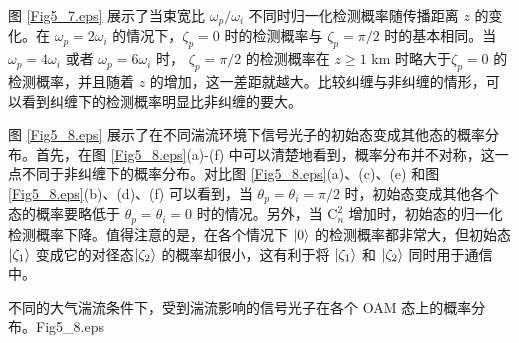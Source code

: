 \documentclass[master]{thesis-uestc}
\begin{document}

图 \ref{Fig5_7.eps} 展示了当束宽比 $\omega_p/\omega_i$ 不同时归一化检测概率随传播距离 $z$ 的变化。在 $\omega_p=2\omega_i$ 的情况下，$\zeta_p=0$ 时的检测概率与 $\zeta_p=\pi/2$ 时的基本相同。当 $\omega_p=4\omega_i$ 或者 $\omega_p=6\omega_i$ 时， $\zeta_p=\pi/2$ 的检测概率在 $z\geq 1$ km 时略大于$\zeta_p=0$ 的检测概率，并且随着 $z$ 的增加，这一差距就越大。比较纠缠与非纠缠的情形，可以看到纠缠下的检测概率明显比非纠缠的要大。

图 \ref{Fig5_8.eps} 展示了在不同湍流环境下信号光子的初始态变成其他态的概率分布。首先，在图 \ref{Fig5_8.eps}(a)-(f) 中可以清楚地看到，概率分布并不对称，这一点不同于非纠缠下的概率分布\citeup{}。对比图 \ref{Fig5_8.eps}(a)、(c)、(e) 和图 \ref{Fig5_8.eps}(b)、(d)、(f) 可以看到，当 $\theta_p=\theta_i=\pi/2$ 时，初始态变成其他各个态的概率要略低于 $\theta_p=\theta_i=0$ 时的情况。另外，当 $\mathrm{C}^2_n$ 增加时，初始态的归一化检测概率下降。值得注意的是，在各个情况下 $\ket{0}$ 的检测概率都非常大，但初始态 $\ket{\zeta_1}$ 变成它的对径态$\ket{\zeta_2}$ 的概率却很小，这有利于将 $\ket{\zeta_1}$ 和 $\ket{\zeta_2}$ 同时用于通信中。

\begin{pics}[H]{不同的大气湍流条件下，受到湍流影响的信号光子在各个 OAM 态上的概率分布。}{Fig5_8.eps}
\end{pics}
\end{document}
